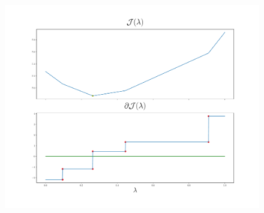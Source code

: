 \documentclass[aspectratio=43]{beamer}
\begin{document}
\begin{frame}

      \begin{figure}[t!]
            \centering
            \includegraphics[width=.6\textwidth]{Chapter4/NeuroCom2021/ejemplo2_hinge.pdf}
            \label{fig:sq_error}
        \end{figure}      

\end{frame}
\end{document}
